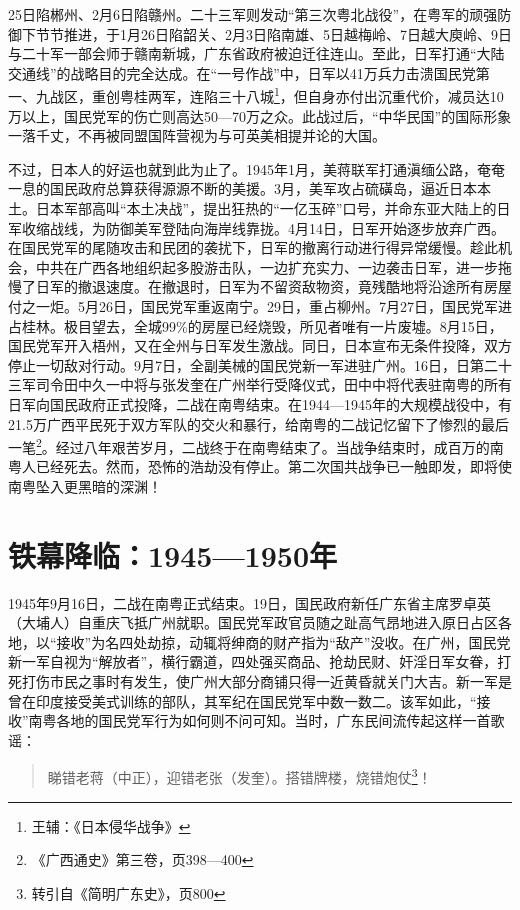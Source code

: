25日陷郴州、2月6日陷赣州。二十三军则发动“第三次粤北战役”，在粤军的顽强防御下节节推进，于1月26日陷韶关、2月3日陷南雄、5日越梅岭、7日越大庾岭、9日与二十军一部会师于赣南新城，广东省政府被迫迁往连山。至此，日军打通“大陆交通线”的战略目的完全达成。在“一号作战”中，日军以41万兵力击溃国民党第一、九战区，重创粤桂两军，连陷三十八城\footnote{王辅：《日本侵华战争》}，但自身亦付出沉重代价，减员达10万以上，国民党军的伤亡则高达50—70万之众。此战过后，“中华民国”的国际形象一落千丈，不再被同盟国阵营视为与可英美相提并论的大国。

不过，日本人的好运也就到此为止了。1945年1月，美蒋联军打通滇缅公路，奄奄一息的国民政府总算获得源源不断的美援。3月，美军攻占硫磺岛，逼近日本本土。日本军部高叫“本土决战”，提出狂热的“一亿玉碎”口号，并命东亚大陆上的日军收缩战线，为防御美军登陆向海岸线靠拢。4月14日，日军开始逐步放弃广西。在国民党军的尾随攻击和民团的袭扰下，日军的撤离行动进行得异常缓慢。趁此机会，中共在广西各地组织起多股游击队，一边扩充实力、一边袭击日军，进一步拖慢了日军的撤退速度。在撤退时，日军为不留资敌物资，竟残酷地将沿途所有房屋付之一炬。5月26日，国民党军重返南宁。29日，重占柳州。7月27日，国民党军进占桂林。极目望去，全城99\%的房屋已经烧毁，所见者唯有一片废墟。8月15日，国民党军开入梧州，又在全州与日军发生激战。同日，日本宣布无条件投降，双方停止一切敌对行动。9月7日，全副美械的国民党新一军进驻广州。16日，日第二十三军司令田中久一中将与张发奎在广州举行受降仪式，田中中将代表驻南粤的所有日军向国民政府正式投降，二战在南粤结束。在1944—1945年的大规模战役中，有21.5万广西平民死于双方军队的交火和暴行，给南粤的二战记忆留下了惨烈的最后一笔\footnote{《广西通史》第三卷，页398—400}。经过八年艰苦岁月，二战终于在南粤结束了。当战争结束时，成百万的南粤人已经死去。然而，恐怖的浩劫没有停止。第二次国共战争已一触即发，即将使南粤坠入更黑暗的深渊！

\section{铁幕降临：1945—1950年}

\indent 1945年9月16日，二战在南粤正式结束。19日，国民政府新任广东省主席罗卓英（大埔人）自重庆飞抵广州就职。国民党军政官员随之趾高气昂地进入原日占区各地，以“接收”为名四处劫掠，动辄将绅商的财产指为“敌产”没收。在广州，国民党新一军自视为“解放者”，横行霸道，四处强买商品、抢劫民财、奸淫日军女眷，打死打伤市民之事时有发生，使广州大部分商铺只得一近黄昏就关门大吉。新一军是曾在印度接受美式训练的部队，其军纪在国民党军中数一数二。该军如此，“接收”南粤各地的国民党军行为如何则不问可知。当时，广东民间流传起这样一首歌谣：

\begin{quote}

睇错老蒋（中正），迎错老张（发奎）。搭错牌楼，烧错炮仗\footnote{转引自《简明广东史》，页800}！

\end{quote}


